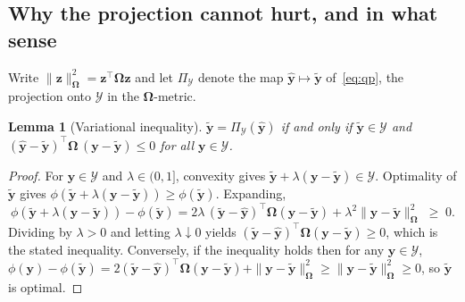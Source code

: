 \documentclass[11pt]{article}
\theoremstyle{plain}
\newtheorem{lemma}[theorem]{Lemma}
\theoremstyle{definition}
\theoremstyle{remark}
\newcommand{\by}{\bm{y}}
\newcommand{\bOm}{\bm{\Omega}}
\newcommand{\yhat}{\hat{\by}}
\newcommand{\ytil}{\tilde{\by}}
\newcommand{\cY}{\mathcal{Y}}
\begin{document}
\subsection{Why the projection cannot hurt, and in what sense}

Write $\|\bm{z}\|_{\bOm}^2 = \bm{z}^{\top}\bOm\bm{z}$ and let $\Pi_{\cY}$ denote the map $\yhat \mapsto \ytil$ of~\eqref{eq:qp}, the projection onto $\cY$ in the $\bOm$-metric.

\begin{lemma}[Variational inequality]
\label{lem:vi}
$\ytil = \Pi_{\cY}(\yhat)$ if and only if $\ytil \in \cY$ and
$(\yhat - \ytil)^{\top}\bOm\,(\by - \ytil) \le 0$ for all $\by \in \cY$.
\end{lemma}
\begin{proof}
For $\by \in \cY$ and $\lambda \in (0,1]$, convexity gives $\ytil + \lambda(\by-\ytil) \in \cY$. Optimality of $\ytil$ gives $\phi(\ytil + \lambda(\by-\ytil)) \ge \phi(\ytil)$. Expanding,
\[
\phi(\ytil+\lambda(\by-\ytil)) - \phi(\ytil)
= 2\lambda\,(\ytil-\yhat)^{\top}\bOm(\by-\ytil) + \lambda^{2}\|\by-\ytil\|_{\bOm}^{2} \;\ge\; 0 .
\]
Dividing by $\lambda>0$ and letting $\lambda \downarrow 0$ yields $(\ytil-\yhat)^{\top}\bOm(\by-\ytil) \ge 0$, which is the stated inequality. Conversely, if the inequality holds then for any $\by \in \cY$,
$\phi(\by) - \phi(\ytil) = 2(\ytil-\yhat)^{\top}\bOm(\by-\ytil) + \|\by-\ytil\|_{\bOm}^{2} \ge \|\by-\ytil\|_{\bOm}^{2} \ge 0$,
so $\ytil$ is optimal.
\end{proof}
\end{document}
